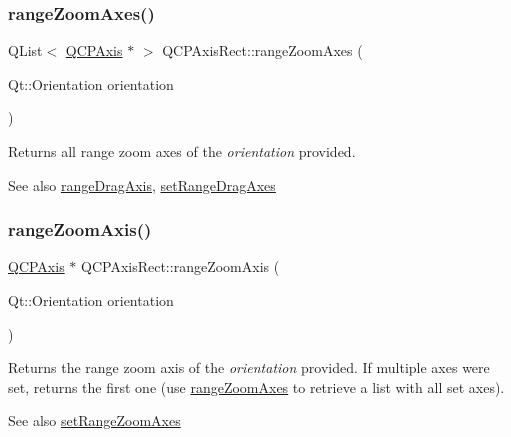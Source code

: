 \mbox{\label{class_q_c_p_axis_rect_a86aac0f435f209d60dacd22cda10c104}} 
\subsubsection{\texorpdfstring{rangeZoomAxes()}{rangeZoomAxes()}}
{\footnotesize\ttfamily Q\+List$<$ \mbox{\hyperlink{class_q_c_p_axis}{Q\+C\+P\+Axis}} $\ast$ $>$ Q\+C\+P\+Axis\+Rect\+::range\+Zoom\+Axes (\begin{DoxyParamCaption}\item[{Qt\+::\+Orientation}]{orientation }\end{DoxyParamCaption})}

Returns all range zoom axes of the {\itshape orientation} provided.

\begin{DoxySeeAlso}{See also}
\mbox{\hyperlink{class_q_c_p_axis_rect_a6d7c22cfc54fac7a3d6ef80b133a8574}{range\+Drag\+Axis}}, \mbox{\hyperlink{class_q_c_p_axis_rect_a648cce336bd99daac4a5ca3e5743775d}{set\+Range\+Drag\+Axes}} 
\end{DoxySeeAlso}
\mbox{\label{class_q_c_p_axis_rect_a679c63f2b8daccfe6ec5110dce3dd3b6}} 
\subsubsection{\texorpdfstring{rangeZoomAxis()}{rangeZoomAxis()}}
{\footnotesize\ttfamily \mbox{\hyperlink{class_q_c_p_axis}{Q\+C\+P\+Axis}} $\ast$ Q\+C\+P\+Axis\+Rect\+::range\+Zoom\+Axis (\begin{DoxyParamCaption}\item[{Qt\+::\+Orientation}]{orientation }\end{DoxyParamCaption})}

Returns the range zoom axis of the {\itshape orientation} provided. If multiple axes were set, returns the first one (use \mbox{\hyperlink{class_q_c_p_axis_rect_a86aac0f435f209d60dacd22cda10c104}{range\+Zoom\+Axes}} to retrieve a list with all set axes).

\begin{DoxySeeAlso}{See also}
\mbox{\hyperlink{class_q_c_p_axis_rect_a9442cca2aa358405f39a64d51eca13d2}{set\+Range\+Zoom\+Axes}} 
\end{DoxySeeAlso}
\mbox{\label{class_q_c_p_axis_rect_ae4e6c4d143aacc88d2d3c56f117c2fe1}} 
